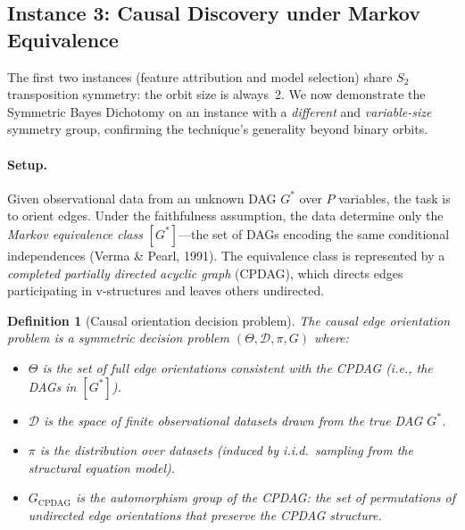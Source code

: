 \documentclass{article}
\newtheorem{definition}[theorem]{Definition}
\begin{document}
\subsection{Instance 3: Causal Discovery under Markov Equivalence}

The first two instances (feature attribution and model selection) share
$S_2$ transposition symmetry: the orbit size is always~2. We now
demonstrate the Symmetric Bayes Dichotomy on an instance with a
\emph{different} and \emph{variable-size} symmetry group, confirming
the technique's generality beyond binary orbits.

\paragraph{Setup.}
Given observational data from an unknown DAG $G^*$ over $P$ variables,
the task is to orient edges. Under the faithfulness assumption, the
data determine only the \emph{Markov equivalence class} $[G^*]$---the
set of DAGs encoding the same conditional independences
(Verma \& Pearl, 1991). The equivalence class is represented by a
\emph{completed partially directed acyclic graph} (CPDAG), which
directs edges participating in v-structures and leaves others
undirected.

\begin{definition}[Causal orientation decision problem]
\label{def:causal-orientation}
The causal edge orientation problem is a symmetric decision problem
$(\Theta, \mathcal{D}, \pi, G)$ where:
\begin{itemize}
    \item $\Theta$ is the set of full edge orientations consistent with
      the CPDAG (i.e., the DAGs in $[G^*]$).
    \item $\mathcal{D}$ is the space of finite observational datasets
      drawn from the true DAG $G^*$.
    \item $\pi$ is the distribution over datasets (induced by i.i.d.\
      sampling from the structural equation model).
    \item $G_{\text{CPDAG}}$ is the \emph{automorphism group of the CPDAG}:
      the set of permutations of undirected edge orientations that
      preserve the CPDAG structure.
\end{itemize}
\end{definition}
\end{document}
